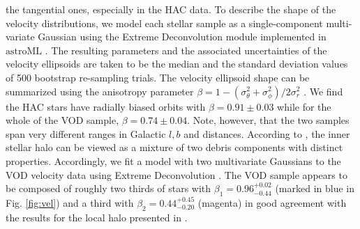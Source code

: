 \documentclass[fleqn,usenatbib]{mnras}
\begin{document}
the tangential ones, especially in the HAC data. To describe the shape
of the velocity distributions, we model each stellar sample as a
single-component multi-variate Gaussian using the Extreme
Deconvolution module implemented in $\mathrm{astroML}$
\citep{astroML}. The resulting parameters and the associated
uncertainties of the velocity ellipsoids are taken to be the median
and the standard deviation values of 500 bootstrap re-sampling trials.
The velocity ellipsoid shape can be summarized using the anisotropy
parameter $\beta=1-(\sigma^2_{\theta}+\sigma^2_{\phi})/2\sigma^2_r$
\citep[see][]{Binney2008}. We find the HAC stars have radially biased
orbits with $\beta = 0.91 \pm 0.03$ while for the whole of the VOD
sample, $\beta = 0.74 \pm 0.04$. Note, however, that the two samples
span very different ranges in Galactic $l,b$ and distances. According
to \citet{Belokurov2018}, the inner stellar halo can be viewed as a
mixture of two debris components with distinct
properties. Accordingly, we fit a model with two multivariate
Gaussians to the VOD velocity data using Extreme Deconvolution
\citep[see][]{ED}. The VOD sample appears to be composed of roughly
two thirds of stars with $\beta_{1}= 0.96^{+0.02}_{-0.44}$ (marked in
blue in Fig. \ref{fig:vel}) and a third with
$\beta_{2}=0.44^{+0.45}_{-0.20}$ (magenta) in good agreement with the
results for the local halo presented in \citet{Belokurov2018}.
%
\end{document}
